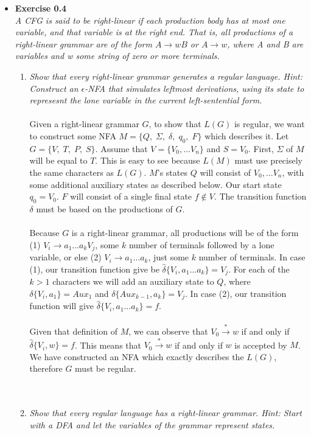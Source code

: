 \documentclass[12pt]{article}
\begin{document}
\begin{itemize}
\item{\textbf{Exercise 0.4}} \\
\emph{A CFG is said to be right-linear if each production body has at most one variable, and that variable is at the right end. That is, all productions of a right-linear grammar are of the form $A \rightarrow wB$ or $A \rightarrow w$, where A and B are variables and w some string of zero or more terminals.}
\begin{enumerate}
\item \emph{Show that every right-linear grammar generates a regular language. Hint: Construct an $\epsilon$-NFA that simulates leftmost derivations, using its state to represesnt the lone variable in the current left-sentential form.} \\
\\ 
Given a right-linear grammar $G$, to show that $L(G)$ is regular, we want to construct some NFA $M = \{Q,\;\Sigma,\;\delta,\;q_0,\;F\}$ which describes it. Let $G=\{V,\;T,\;P,\;S\}$. Assume that $V = \{V_0,\dots V_n\}$ and $S=V_0$. First, $\Sigma$ of $M$ will be equal to $T$. This is easy to see because $L(M)$ must use precisely the same characters as $L(G)$. $M$'s states $Q$ will consist of $V_0,\dots V_n$, with some additional auxiliary states as described below. Our start state $q_0 = V_0$. $F$ will consist of a single final state $f \notin V$. The transition function $\delta$ must be based on the productions of $G$. \\
\\
Because $G$ is a right-linear grammar, all productions will be of the form (1) $V_i \rightarrow a_1\dots a_kV_j$, some $k$ number of terminals followed by a lone variable, or else (2) $V_i \rightarrow a_1\dots a_k$, just some $k$ number of terminals. In case (1), our transition function give be $\hat\delta\{V_i, a_1\dots a_k\} = V_j$. For each of the $k > 1$ characters we will add an auxiliary state to $Q$, where $\delta\{V_i, a_1\} = Aux_1$ and $\delta\{Aux_{k-1}, a_k\} = V_j$. In case (2), our transition function will give $\hat\delta\{V_i, a_1\dots a_k\} = f$. \\
\\
Given that definition of $M$, we can observe that $V_0 \xrightarrow{\ast}w$ if and only if $\hat\delta\{V_i, w\} = f$. This means that $V_0 \xrightarrow{\ast}w$ if and only if $w$ is accepted by $M$. We have constructed an NFA which exactly describes the $L(G)$, therefore $G$ must be regular. \\
\\
‎
\item \emph{Show that every regular language has a right-linear grammar. Hint: Start with a DFA and let the variables of the grammar represent states.} \\

\end{enumerate}
\end{itemize}
\end{document}
